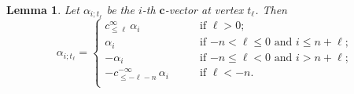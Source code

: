 \documentclass[12pt]{amsart}
\newcommand{\bfc}{\mathbf{c}}
\newcommand{\cv}{\alpha}
\newcommand{\Zidx}{\ell}
\newtheorem{lemma}[theorem]{Lemma}
\theoremstyle{remark}
\numberwithin{equation}{section}
\numberwithin{figure}{section}
\begin{document}
\begin{lemma}
  \label{lemma:c-vectors}
  Let $\cv_{i;t_\Zidx}$ be the $i$-th $\bfc$-vector at vertex $t_\Zidx$.
  Then
  \begin{equation}
\label{eq:c-vectors}
    \cv_{i;t_\Zidx}
    =
    \begin{cases}
      c^\infty_{\le\Zidx}\, \alpha_i & \text{if $\Zidx>0$;}\\
      \alpha_i & \text{if $-n < \Zidx \leq 0$ and  $i\leq n+\Zidx$;} \\
      -\alpha_i & \text{if $-n\leq \Zidx < 0$ and $i > n+\Zidx$;} \\
      -c^{-\infty}_{\le-\Zidx-n}\, \alpha_i \qquad & \text{if $\Zidx<-n$.}\\
    \end{cases}
  \end{equation}
\end{lemma}
\end{document}
